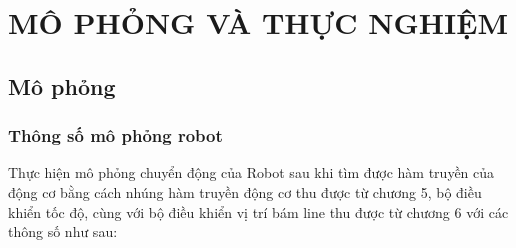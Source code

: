 \chapter{MÔ PHỎNG VÀ THỰC NGHIỆM}
     \section{Mô phỏng}
          \subsection{Thông số mô phỏng robot}
               \hspace*{0.6cm}Thực hiện mô phỏng chuyển động của Robot sau khi tìm được hàm truyền của động cơ bằng cách nhúng hàm truyền động cơ thu được từ chương 5,
               bộ điều khiển tốc độ, cùng với bộ điều khiển vị trí bám line thu được từ chương 6 với các thông số như sau:
